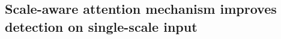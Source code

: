     
    
    
    \subsection{Scale-aware attention mechanism improves detection on single-scale input}
    
